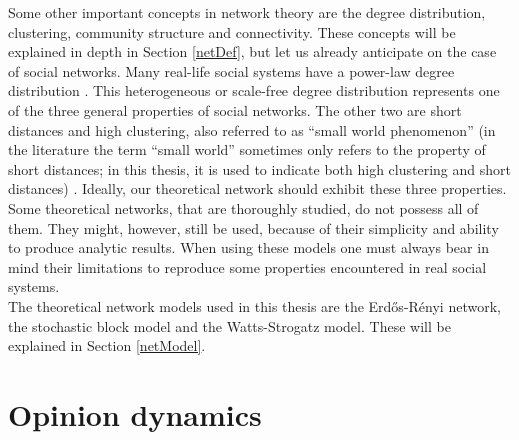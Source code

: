 \documentclass[11 pt , letterpaper , twoside , openright]{book}
\begin{document}
\newline
Some other important concepts in network theory are the degree distribution, clustering, community structure and connectivity. These concepts will be explained in depth in Section \ref{netDef}, but let us already anticipate on the case of social networks. Many real-life social systems have a power-law degree distribution \cite{Muchnik2013}. This heterogeneous or scale-free degree distribution represents one of the three general properties of social networks. The other two are short distances and high clustering, also referred to as ``small world phenomenon'' (in the literature the term ``small world'' sometimes only refers to the property of short distances; in this thesis, it is used to indicate both high clustering and short distances) \cite{Muchnik2013}. Ideally, our theoretical network should exhibit these three properties. Some theoretical networks, that are thoroughly studied, do not possess all of them. They might, however, still be used, because of their simplicity and ability to produce analytic results. When using these models one must always bear in mind their limitations to reproduce some properties encountered in real social systems. \\
\newline
The theoretical network models used in this thesis are the Erd\H{o}s-R\'{e}nyi network, the stochastic block model and the Watts-Strogatz model. These will be explained in Section \ref{netModel}. 

\section{Opinion dynamics}\label{Opinion}
\end{document}
